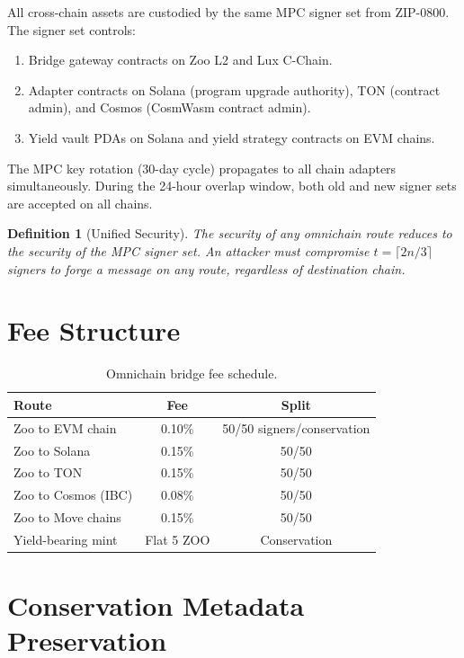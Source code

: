 \documentclass[11pt,letterpaper]{article}
\newtheorem{definition}{Definition}[section]
\begin{document}
All cross-chain assets are custodied by the same MPC signer set from ZIP-0800. The signer set controls:

\begin{enumerate}
    \item Bridge gateway contracts on Zoo L2 and Lux C-Chain.
    \item Adapter contracts on Solana (program upgrade authority), TON (contract admin), and Cosmos (CosmWasm contract admin).
    \item Yield vault PDAs on Solana and yield strategy contracts on EVM chains.
\end{enumerate}

The MPC key rotation (30-day cycle) propagates to all chain adapters simultaneously. During the 24-hour overlap window, both old and new signer sets are accepted on all chains.

\begin{definition}[Unified Security]
The security of any omnichain route reduces to the security of the MPC signer set. An attacker must compromise $t = \lceil 2n/3 \rceil$ signers to forge a message on any route, regardless of destination chain.
\end{definition}

\section{Fee Structure}

\begin{table}[t]
\centering
\begin{tabular}{lcc}
\toprule
\textbf{Route} & \textbf{Fee} & \textbf{Split} \\
\midrule
Zoo to EVM chain & 0.10\% & 50/50 signers/conservation \\
Zoo to Solana & 0.15\% & 50/50 \\
Zoo to TON & 0.15\% & 50/50 \\
Zoo to Cosmos (IBC) & 0.08\% & 50/50 \\
Zoo to Move chains & 0.15\% & 50/50 \\
Yield-bearing mint & Flat 5 ZOO & Conservation \\
\bottomrule
\end{tabular}
\caption{Omnichain bridge fee schedule.}
\label{tab:fees}
\end{table}

\section{Conservation Metadata Preservation}
\end{document}
